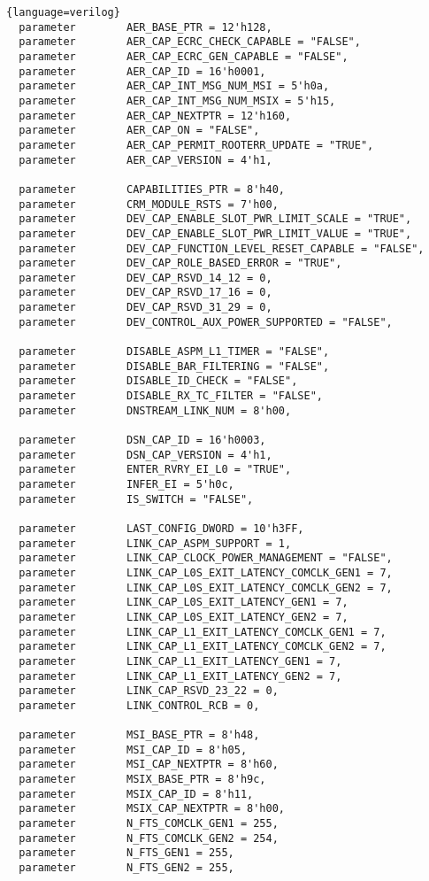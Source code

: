 \begin{lstlisting}{language=verilog}
  parameter        AER_BASE_PTR = 12'h128, 
  parameter        AER_CAP_ECRC_CHECK_CAPABLE = "FALSE", 
  parameter        AER_CAP_ECRC_GEN_CAPABLE = "FALSE", 
  parameter        AER_CAP_ID = 16'h0001, 
  parameter        AER_CAP_INT_MSG_NUM_MSI = 5'h0a, 
  parameter        AER_CAP_INT_MSG_NUM_MSIX = 5'h15, 
  parameter        AER_CAP_NEXTPTR = 12'h160, 
  parameter        AER_CAP_ON = "FALSE", 
  parameter        AER_CAP_PERMIT_ROOTERR_UPDATE = "TRUE", 
  parameter        AER_CAP_VERSION = 4'h1, 

  parameter        CAPABILITIES_PTR = 8'h40, 
  parameter        CRM_MODULE_RSTS = 7'h00, 
  parameter        DEV_CAP_ENABLE_SLOT_PWR_LIMIT_SCALE = "TRUE", 
  parameter        DEV_CAP_ENABLE_SLOT_PWR_LIMIT_VALUE = "TRUE", 
  parameter        DEV_CAP_FUNCTION_LEVEL_RESET_CAPABLE = "FALSE", 
  parameter        DEV_CAP_ROLE_BASED_ERROR = "TRUE", 
  parameter        DEV_CAP_RSVD_14_12 = 0, 
  parameter        DEV_CAP_RSVD_17_16 = 0, 
  parameter        DEV_CAP_RSVD_31_29 = 0, 
  parameter        DEV_CONTROL_AUX_POWER_SUPPORTED = "FALSE", 

  parameter        DISABLE_ASPM_L1_TIMER = "FALSE", 
  parameter        DISABLE_BAR_FILTERING = "FALSE", 
  parameter        DISABLE_ID_CHECK = "FALSE", 
  parameter        DISABLE_RX_TC_FILTER = "FALSE", 
  parameter        DNSTREAM_LINK_NUM = 8'h00, 

  parameter        DSN_CAP_ID = 16'h0003, 
  parameter        DSN_CAP_VERSION = 4'h1, 
  parameter        ENTER_RVRY_EI_L0 = "TRUE", 
  parameter        INFER_EI = 5'h0c, 
  parameter        IS_SWITCH = "FALSE", 

  parameter        LAST_CONFIG_DWORD = 10'h3FF, 
  parameter        LINK_CAP_ASPM_SUPPORT = 1, 
  parameter        LINK_CAP_CLOCK_POWER_MANAGEMENT = "FALSE", 
  parameter        LINK_CAP_L0S_EXIT_LATENCY_COMCLK_GEN1 = 7, 
  parameter        LINK_CAP_L0S_EXIT_LATENCY_COMCLK_GEN2 = 7, 
  parameter        LINK_CAP_L0S_EXIT_LATENCY_GEN1 = 7, 
  parameter        LINK_CAP_L0S_EXIT_LATENCY_GEN2 = 7, 
  parameter        LINK_CAP_L1_EXIT_LATENCY_COMCLK_GEN1 = 7, 
  parameter        LINK_CAP_L1_EXIT_LATENCY_COMCLK_GEN2 = 7, 
  parameter        LINK_CAP_L1_EXIT_LATENCY_GEN1 = 7, 
  parameter        LINK_CAP_L1_EXIT_LATENCY_GEN2 = 7, 
  parameter        LINK_CAP_RSVD_23_22 = 0, 
  parameter        LINK_CONTROL_RCB = 0, 

  parameter        MSI_BASE_PTR = 8'h48, 
  parameter        MSI_CAP_ID = 8'h05, 
  parameter        MSI_CAP_NEXTPTR = 8'h60, 
  parameter        MSIX_BASE_PTR = 8'h9c, 
  parameter        MSIX_CAP_ID = 8'h11, 
  parameter        MSIX_CAP_NEXTPTR = 8'h00, 
  parameter        N_FTS_COMCLK_GEN1 = 255, 
  parameter        N_FTS_COMCLK_GEN2 = 254, 
  parameter        N_FTS_GEN1 = 255, 
  parameter        N_FTS_GEN2 = 255, 


\end{lstlisting}

